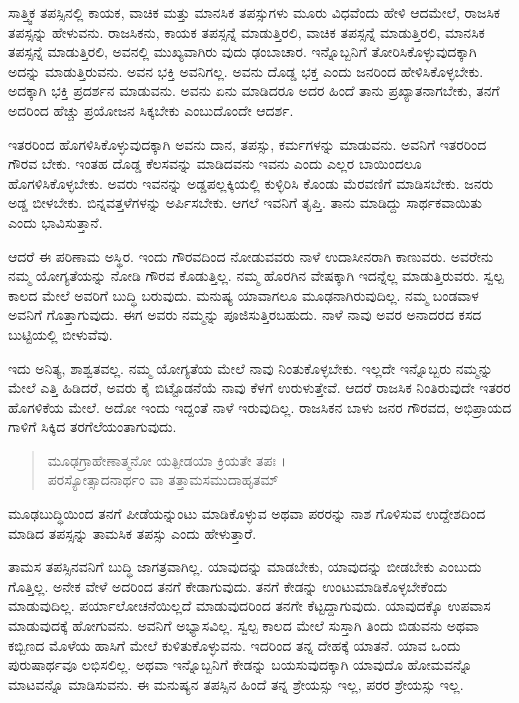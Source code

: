 ಸಾತ್ತ್ವಿಕ ತಪಸ್ಸಿನಲ್ಲಿ ಕಾಯಕ, ವಾಚಿಕ ಮತ್ತು ಮಾನಸಿಕ ತಪಸ್ಸುಗಳು ಮೂರು ವಿಧವೆಂದು ಹೇಳಿ ಆದಮೇಲೆ, ರಾಜಸಿಕ ತಪಸ್ಸನ್ನು ಹೇಳುವನು. ರಾಜಸಿಕನು, ಕಾಯಕ ತಪಸ್ಸನ್ನೆ ಮಾಡುತ್ತಿರಲಿ, ವಾಚಿಕ ತಪಸ್ಸನ್ನೆ ಮಾಡುತ್ತಿರಲಿ, ಮಾನಸಿಕ ತಪಸ್ಸನ್ನೆ ಮಾಡುತ್ತಿರಲಿ, ಅವನಲ್ಲಿ ಮುಖ್ಯವಾಗಿರು ವುದು ಢಂಬಾಚಾರ. ಇನ್ನೊಬ್ಬನಿಗೆ ತೋರಿಸಿಕೊಳ್ಳುವುದಕ್ಕಾಗಿ ಅದನ್ನು ಮಾಡುತ್ತಿರುವನು. ಅವನ ಭಕ್ತಿ ಅವನಿಗಲ್ಲ. ಅವನು ದೊಡ್ಡ ಭಕ್ತ ಎಂದು ಜನರಿಂದ ಹೇಳಿಸಿಕೊಳ್ಳಬೇಕು. ಅದಕ್ಕಾಗಿ ಭಕ್ತಿ ಪ್ರದರ್ಶನ ಮಾಡುವನು. ಅವನು ಏನು ಮಾಡಿದರೂ ಅದರ ಹಿಂದೆ ತಾನು ಪ್ರಖ್ಯಾತನಾಗಬೇಕು, ತನಗೆ ಅದರಿಂದ ಹೆಚ್ಚು ಪ್ರಯೋಜನ ಸಿಕ್ಕಬೇಕು ಎಂಬುದೊಂದೇ ಆದರ್ಶ.

ಇತರರಿಂದ ಹೊಗಳಿಸಿಕೊಳ್ಳುವುದಕ್ಕಾಗಿ ಅವನು ದಾನ, ತಪಸ್ಸು, ಕರ್ಮಗಳನ್ನು ಮಾಡುವನು. ಅವನಿಗೆ ಇತರರಿಂದ ಗೌರವ ಬೇಕು. ಇಂತಹ ದೊಡ್ಡ ಕೆಲಸವನ್ನು ಮಾಡಿದವನು ಇವನು ಎಂದು ಎಲ್ಲರ ಬಾಯಿಂದಲೂ ಹೊಗಳಿಸಿಕೊಳ್ಳಬೇಕು. ಅವರು ಇವನನ್ನು ಅಡ್ಡಪಲ್ಲಕ್ಕಿಯಲ್ಲಿ ಕುಳ್ಳಿರಿಸಿ ಕೊಂಡು ಮೆರವಣಿಗೆ ಮಾಡಿಸಬೇಕು. ಜನರು ಅಡ್ಡ ಬೀಳಬೇಕು. ಬಿನ್ನವತ್ತಳೆಗಳನ್ನು ಅರ್ಪಿಸಬೇಕು. ಆಗಲೆ ಇವನಿಗೆ ತೃಪ್ತಿ. ತಾನು ಮಾಡಿದ್ದು ಸಾರ್ಥಕವಾಯಿತು ಎಂದು ಭಾವಿಸುತ್ತಾನೆ.

ಆದರೆ ಈ ಪರಿಣಾಮ ಅಸ್ಥಿರ. ಇಂದು ಗೌರವದಿಂದ ನೋಡುವವರು ನಾಳೆ ಉದಾಸೀನರಾಗಿ ಕಾಣುವರು. ಅವರೇನು ನಮ್ಮ ಯೋಗ್ಯತೆಯನ್ನು ನೋಡಿ ಗೌರವ ಕೊಡುತ್ತಿಲ್ಲ. ನಮ್ಮ ಹೊರಗಿನ ವೇಷಕ್ಕಾಗಿ ಇದನ್ನೆಲ್ಲ ಮಾಡುತ್ತಿರುವರು. ಸ್ವಲ್ಪ ಕಾಲದ ಮೇಲೆ ಅವರಿಗೆ ಬುದ್ಧಿ ಬರುವುದು. ಮನುಷ್ಯ ಯಾವಾಗಲೂ ಮೂಢನಾಗಿರುವುದಿಲ್ಲ. ನಮ್ಮ ಬಂಡವಾಳ ಅವನಿಗೆ ಗೊತ್ತಾಗುವುದು. ಈಗ ಅವರು ನಮ್ಮನ್ನು ಪೂಜಿಸುತ್ತಿರಬಹುದು. ನಾಳೆ ನಾವು ಅವರ ಅನಾದರದ ಕಸದ ಬುಟ್ಟಿಯಲ್ಲಿ ಬೀಳುವೆವು.

ಇದು ಅನಿತ್ಯ, ಶಾಶ್ವತವಲ್ಲ. ನಮ್ಮ ಯೋಗ್ಯತೆಯ ಮೇಲೆ ನಾವು ನಿಂತುಕೊಳ್ಳಬೇಕು. ಇಲ್ಲದೇ ಇನ್ನೊಬ್ಬರು ನಮ್ಮನ್ನು ಮೇಲೆ ಎತ್ತಿ ಹಿಡಿದರೆ, ಅವರು ಕೈ ಬಿಟ್ಟೊಡನೆಯೆ ನಾವು ಕೆಳಗೆ ಉರುಳುತ್ತೇವೆ. ಆದರೆ ರಾಜಸಿಕ ನಿಂತಿರುವುದೇ ಇತರರ ಹೊಗಳಿಕೆಯ ಮೇಲೆ. ಅದೋ ಇಂದು ಇದ್ದಂತೆ ನಾಳೆ ಇರುವುದಿಲ್ಲ. ರಾಜಸಿಕನ ಬಾಳು ಜನರ ಗೌರವದ, ಅಭಿಪ್ರಾಯದ ಗಾಳಿಗೆ ಸಿಕ್ಕಿದ ತರಗೆಲೆಯಂತಾಗುವುದು.

\begin{verse}
ಮೂಢಗ್ರಾಹೇಣಾತ್ಮನೋ ಯತ್ಪೀಡಯಾ ಕ್ರಿಯತೇ ತಪಃ ।\\ಪರಸ್ಯೋತ್ಸಾದನಾರ್ಥಂ ವಾ ತತ್ತಾಮಸಮುದಾಹೃತಮ್ 
\end{verse}

{\small ಮೂಢಬುದ್ಧಿಯಿಂದ ತನಗೆ ಪೀಡೆಯನ್ನುಂಟು ಮಾಡಿಕೊಳ್ಳುವ ಅಥವಾ ಪರರನ್ನು ನಾಶ ಗೊಳಿಸುವ ಉದ್ದೇಶದಿಂದ ಮಾಡಿದ ತಪಸ್ಸನ್ನು ತಾಮಸಿಕ ತಪಸ್ಸು ಎಂದು ಹೇಳುತ್ತಾರೆ.}

ತಾಮಸ ತಪಸ್ಸಿನವನಿಗೆ ಬುದ್ಧಿ ಜಾಗತ್ರವಾಗಿಲ್ಲ. ಯಾವುದನ್ನು ಮಾಡಬೇಕು, ಯಾವುದನ್ನು ಬೀಡಬೇಕು ಎಂಬುದು ಗೊತ್ತಿಲ್ಲ. ಅನೇಕ ವೇಳೆ ಅದರಿಂದ ತನಗೆ ಕೇಡಾಗುವುದು. ತನಗೆ ಕೇಡನ್ನು ಉಂಟುಮಾಡಿಕೊಳ್ಳಬೇಕೆಂದು ಮಾಡುವುದಿಲ್ಲ. ಪರ್ಯಾಲೋಚನೆಯಿಲ್ಲದೆ ಮಾಡುವುದರಿಂದ ತನಗೇ ಕೆಟ್ಟದ್ದಾಗುವುದು. ಯಾವುದಕ್ಕೊ ಉಪವಾಸ ಮಾಡುವುದಕ್ಕೆ ಹೋಗುವನು. ಅವನಿಗೆ ಅಭ್ಯಾಸವಿಲ್ಲ. ಸ್ವಲ್ಪ ಕಾಲದ ಮೇಲೆ ಸುಸ್ತಾಗಿ ತಿಂದು ಬಿಡುವನು ಅಥವಾ ಕಬ್ಬಿಣದ ಮೊಳೆಯ ಹಾಸಿಗೆ ಮೇಲೆ ಕುಳಿತುಕೊಳ್ಳುವನು. ಇದರಿಂದ ತನ್ನ ದೇಹಕ್ಕೆ ಯಾತನೆ. ಯಾವ ಒಂದು ಪುರುಷಾರ್ಥವೂ ಲಭಿಸಲಿಲ್ಲ. ಅಥವಾ ಇನ್ನೊಬ್ಬನಿಗೆ ಕೇಡನ್ನು ಬಯಸುವುದಕ್ಕಾಗಿ ಯಾವುದೊ ಹೋಮವನ್ನೊ ಮಾಟವನ್ನೊ ಮಾಡಿಸುವನು. ಈ ಮನುಷ್ಯನ ತಪಸ್ಸಿನ ಹಿಂದೆ ತನ್ನ ಶ್ರೇಯಸ್ಸು ಇಲ್ಲ, ಪರರ ಶ್ರೇಯಸ್ಸು ಇಲ್ಲ.


